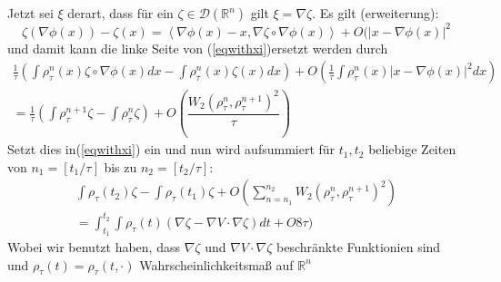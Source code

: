 \documentclass[11pt,a4paper,notitlepage]{scrreprt}
\newcommand{\RR}{\mathbb{R}}
\begin{document}
Jetzt sei $\xi$ derart, dass für ein $\zeta\in\mathcal{D}(\RR^n)$ gilt $\xi=\nabla\zeta$. Es gilt (erweiterung):
\begin{equation}
\zeta(\nabla\phi(x))-\zeta(x)=\left\langle\nabla\phi(x)-x,\nabla\zeta\circ\nabla\phi(x)\right\rangle+O(\vert x-\nabla\phi(x)\vert^2
\end{equation}
und damit kann die linke Seite von (\ref{eqwithxi})ersetzt werden durch
\begin{align*}
\frac{1}{\tau}\left(\int \rho_\tau^n(x)\zeta\circ\nabla\phi(x)dx-\int\rho_\tau^n(x)\zeta(x)dx\right)+O\left(\frac{1}{\tau}\int\rho_\tau^n(x)\vert x-\nabla\phi(x)\vert^2dx\right)\\
=\frac{1}{\tau}\left(\int\rho_\tau^{n+1}\zeta-\int\rho_\tau^n\zeta\right)+O\left(\dfrac{W_2(\rho_\tau^n,\rho_\tau^{n+1})^2}{\tau}\right)
\end{align*}
Setzt dies in(\ref{eqwithxi}) ein und  nun wird aufsummiert für $t_1,t_2$ beliebige Zeiten von $n_1=[t_1/\tau]$ bis zu $n_2=[t_2/\tau]$:
\begin{eqnarray}
\int\rho_\tau(t_2)\zeta-\int\rho_\tau(t_1)\zeta+O\left(\sum_{n=n_1}^{n_2}W_2(\rho_\tau^n,\rho_\tau^{n+1})^2\right)\\
=\int_{t_1}^{t_2}\int\rho_\tau(t)(\nabla\zeta-\nabla V\cdot\nabla\zeta)dt+O8\tau)
\end{eqnarray}
Wobei wir benutzt haben, dass $\nabla\zeta$ und $\nabla V\cdot\nabla\zeta$ beschränkte Funktionien sind und $\rho_\tau(t)=\rho_\tau(t,\cdot)$ Wahrscheinlichkeitsmaß auf $\RR^n$
\end{document}
